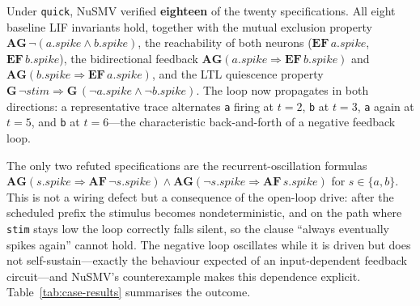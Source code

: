 \documentclass[
]{ceurart}
\begin{document}
Under \texttt{quick}, NuSMV verified \textbf{eighteen} of the twenty specifications.
All eight baseline LIF invariants hold, together with the mutual exclusion property
$\mathbf{AG}\,\neg(a.\mathit{spike} \land b.\mathit{spike})$, the reachability of
both neurons ($\mathbf{EF}\, a.\mathit{spike}$, $\mathbf{EF}\, b.\mathit{spike}$),
the bidirectional feedback $\mathbf{AG}(a.\mathit{spike} \Rightarrow \mathbf{EF}\,
b.\mathit{spike})$ and $\mathbf{AG}(b.\mathit{spike} \Rightarrow \mathbf{EF}\,
a.\mathit{spike})$, and the LTL quiescence property $\mathbf{G}\,\neg\mathit{stim}
\Rightarrow \mathbf{G}\,(\neg a.\mathit{spike} \land \neg b.\mathit{spike})$. The loop
now propagates in both directions: a representative trace alternates \texttt{a} firing
at $t = 2$, \texttt{b} at $t = 3$, \texttt{a} again at $t = 5$, and \texttt{b} at
$t = 6$---the characteristic back-and-forth of a negative feedback loop.

The only two refuted specifications are the recurrent-oscillation formulas
$\mathbf{AG}(s.\mathit{spike} \Rightarrow \mathbf{AF}\,\neg s.\mathit{spike}) \land
\mathbf{AG}(\neg s.\mathit{spike} \Rightarrow \mathbf{AF}\, s.\mathit{spike})$ for
$s \in \{a, b\}$. This is not a wiring defect but a consequence of the open-loop
drive: after the scheduled prefix the stimulus becomes nondeterministic, and on the
path where \texttt{stim} stays low the loop correctly falls silent, so the clause
``always eventually spikes again'' cannot hold. The negative loop oscillates while it
is driven but does not self-sustain---exactly the behaviour expected of an
input-dependent feedback circuit---and NuSMV's counterexample makes this dependence
explicit. Table~\ref{tab:case-results} summarises the outcome.
\end{document}
